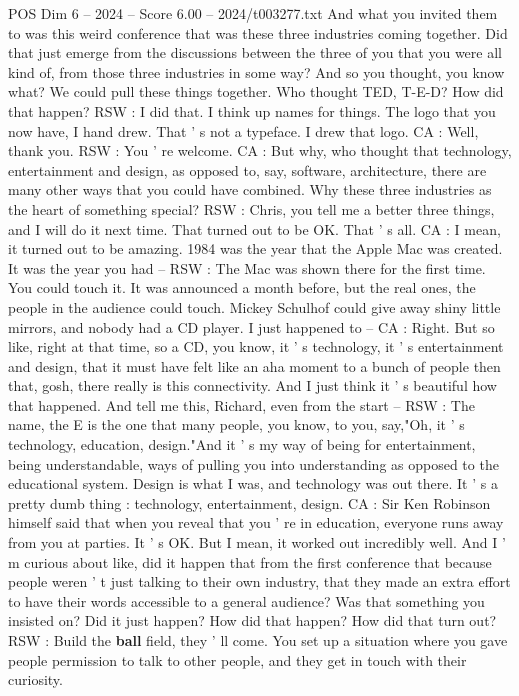 \begin{textsample}{POS Dim 6 – 2024 – Score 6.00 – 2024/t003277.txt}
And what you invited them to was this weird conference that was these three industries coming together.
Did that just emerge from the discussions between the three of you that you were all kind of, from those three industries in some way?
And so you thought, you know what?
We could pull these things together.
Who thought TED, T-E-D?
How did that happen?
RSW : I did that.
I think up names for things.
The logo that you now have, I hand drew.
That ' s not a typeface.
I drew that logo.
CA : Well, thank you.
RSW : You ' re welcome.
CA : But why, who thought that technology, entertainment and design, as opposed to, say, software, architecture, there are many other ways that you could have combined.
Why these three industries as the heart of something special?
RSW : Chris, you tell me a better three things, and I will do it next time.
That turned out to be OK.
That ' s all.
CA : I mean, it turned out to be amazing. 1984 was the year that the Apple Mac was created.
It was the year you had -- RSW : The Mac was shown there for the first time.
You could touch it.
It was announced a month before, but the real ones, the people in the audience could touch.
Mickey Schulhof could give away shiny little mirrors, and nobody had a CD player.
I just happened to -- CA : Right.
But so like, right at that time, so a CD, you know, it ' s technology, it ' s entertainment and design, that it must have felt like an aha moment to a bunch of people then that, gosh, there really is this connectivity.
And I just think it ' s beautiful how that happened.
And tell me this, Richard, even from the start -- RSW : The name, the E is the one that many people, you know, to you, say,"Oh, it ' s technology, education, design."And it ' s my way of being for entertainment, being understandable, ways of pulling you into understanding as opposed to the educational system.
Design is what I was, and technology was out there.
It ' s a pretty dumb thing : technology, entertainment, design.
CA : Sir Ken Robinson himself said that when you reveal that you ' re in education, everyone runs away from you at parties.
It ' s OK.
But I mean, it worked out incredibly well.
And I ' m curious about like, did it happen that from the first conference that because people weren ' t just talking to their own industry, that they made an extra effort to have their words accessible to a general audience?
Was that something you insisted on?
Did it just happen?
How did that happen?
How did that turn out?
RSW : Build the \textbf{ball} field, they ' ll come.
You set up a situation where you gave people permission to talk to other people, and they get in touch with their curiosity.

\end{textsample}
